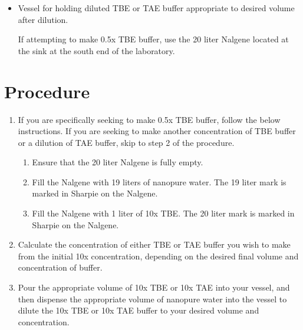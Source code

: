 \documentclass[
  letterpaper,
  DIV=11,
  numbers=noendperiod]{scrreprt}
\providecommand{\tightlist}{%
  \setlength{\itemsep}{0pt}\setlength{\parskip}{0pt}}\usepackage{longtable,booktabs,array}
\begin{document}
\begin{itemize}
\item
  Vessel for holding diluted TBE or TAE buffer appropriate to desired
  volume after dilution.

  \begin{tcolorbox}[enhanced jigsaw, rightrule=.15mm, title=\textcolor{quarto-callout-important-color}{\faExclamation}\hspace{0.5em}{NOTE}, titlerule=0mm, opacitybacktitle=0.6, toprule=.15mm, bottomrule=.15mm, opacityback=0, left=2mm, colframe=quarto-callout-important-color-frame, breakable, coltitle=black, colback=white, colbacktitle=quarto-callout-important-color!10!white, bottomtitle=1mm, leftrule=.75mm, toptitle=1mm, arc=.35mm]

  If attempting to make 0.5x TBE buffer, use the 20 liter Nalgene
  located at the sink at the south end of the laboratory.

  \end{tcolorbox}
\end{itemize}

\hypertarget{procedure-103}{%
\section{Procedure}\label{procedure-103}}

\begin{enumerate}
\def\labelenumi{\arabic{enumi}.}
\tightlist
\item
  If you are specifically seeking to make 0.5x TBE buffer, follow the
  below instructions. If you are seeking to make another concentration
  of TBE buffer or a dilution of TAE buffer, skip to step 2 of the
  procedure.

  \begin{enumerate}
  \def\labelenumii{\alph{enumii}.}
  \tightlist
  \item
    Ensure that the 20 liter Nalgene is fully empty.
  \item
    Fill the Nalgene with 19 liters of nanopure water. The 19 liter mark
    is marked in Sharpie on the Nalgene.
  \item
    Fill the Nalgene with 1 liter of 10x TBE. The 20 liter mark is
    marked in Sharpie on the Nalgene.
  \end{enumerate}
\item
  Calculate the concentration of either TBE or TAE buffer you wish to
  make from the initial 10x concentration, depending on the desired
  final volume and concentration of buffer.
\item
  Pour the appropriate volume of 10x TBE or 10x TAE into your vessel,
  and then dispense the appropriate volume of nanopure water into the
  vessel to dilute the 10x TBE or 10x TAE buffer to your desired volume
  and concentration.
\end{enumerate}
\end{document}
